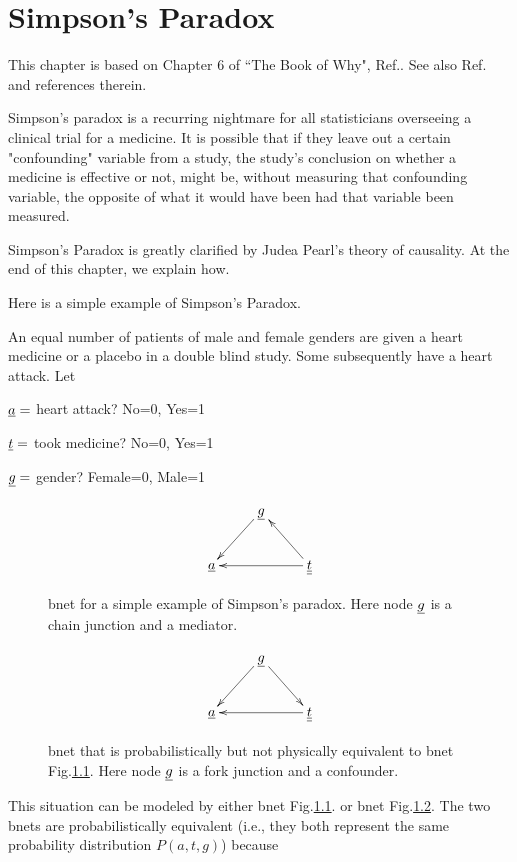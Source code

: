 \chapter{Simpson's Paradox}
This chapter 
is based on Chapter 6 of 
``The Book of Why", Ref.\cite{book-why}.
See also
Ref.\cite{wiki-simpson}
and references therein.


Simpson's paradox is a recurring 
nightmare for all statisticians 
overseeing a clinical trial for 
a medicine. It is possible that
 if they leave out a certain 
"confounding" variable from a study, 
the study's conclusion on whether
 a medicine is effective or not, might be,
 without measuring that confounding variable, 
the opposite of what it would have 
been had that variable been measured.

Simpson's Paradox is greatly clarified
 by Judea Pearl's theory of causality.
 At the end of this chapter, 
we explain how.

Here is a simple example of 
Simpson's Paradox.

An equal 
number of  patients of male and 
female genders
 are given a heart medicine or a placebo 
in a double blind study.
 Some subsequently have a heart 
attack. Let

$ \underline{a}=$ heart attack? No=0, Yes=1

$ \underline{t}=$ took medicine? No=0, Yes=1

$ \underline{g}=$ gender? Female=0, Male=1



\begin{figure}[h!]
\centering
$$\xymatrix{
&\rvg\ar[dl]&\\
\rva&&\ul{\rvt}\ar[ul]\ar[ll]
}$$
\caption{bnet for a simple example of 
Simpson's paradox.
Here node ${\underline{g}}$ is 
a chain junction and a mediator.}
\label{fig-simpson-chain}
\end{figure}

\begin{figure}[h!]
\centering
$$\xymatrix{
&\rvg\ar[dl]\ar[dr]&\\
\rva&&\ul{\rvt}\ar[ll]
}$$
\caption{bnet that is probabilistically
but not physically
equivalent to bnet
Fig.\ref{fig-simpson-chain}.
Here node ${\underline{g}}$ is 
a fork junction and a confounder.}
\label{fig-simpson-fork}
\end{figure}




This situation can be modeled by 
either
bnet Fig.\ref{fig-simpson-chain}.
or bnet
 Fig.\ref{fig-simpson-fork}.
The two bnets are 
probabilistically
equivalent 
(i.e., they
both represent the same
probability distribution $P(a, t, g)$)
because

